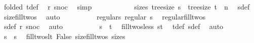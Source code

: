 \begin{isabellebody}
\ {}{\isacharparenleft}{\kern0pt}{}{\isacharparenright}{\kern0pt}{\isacharbrackleft}{\kern0pt}folded\ t{\isacharunderscore}{\kern0pt}def{\isacharbrackright}{\kern0pt}\ \isamarkupfalse%
\ r\ snoc\ \isamarkupfalse%
\ simp\isanewline
\ \ \ \ \ \ \ \ \isamarkupfalse%
\ \isamarkupfalse%
\ size{\isacharunderscore}{\kern0pt}s{\isacharprime}{\kern0pt}{\isacharprime}{\kern0pt}{\isacharcolon}{\kern0pt}\ {\isachardoublequoteopen}tree{\isacharunderscore}{\kern0pt}size\ s{\isacharprime}{\kern0pt}{\isacharprime}{\kern0pt}\ {\isacharequal}{\kern0pt}\ tree{\isacharunderscore}{\kern0pt}size\ t\ {\isacharplus}{\kern0pt}\ n{\isachardoublequoteclose}\ \isamarkupfalse%
\ s{\isacharprime}{\kern0pt}{\isacharprime}{\kern0pt}{\isacharunderscore}{\kern0pt}def\ \isamarkupfalse%
\ size{\isacharunderscore}{\kern0pt}fill{\isacharunderscore}{\kern0pt}twos\ \isamarkupfalse%
\ auto\isanewline
\ \ \ \ \ \ \ \ \isamarkupfalse%
\ regular{\isacharunderscore}{\kern0pt}s{\isacharprime}{\kern0pt}{\isacharprime}{\kern0pt}{\isacharcolon}{\kern0pt}\ {\isachardoublequoteopen}regular\ s{\isacharprime}{\kern0pt}{\isacharprime}{\kern0pt}{\isachardoublequoteclose}\ \isamarkupfalse%
\ regular{\isacharunderscore}{\kern0pt}fill{\isacharunderscore}{\kern0pt}twos\ {}{\isacharparenleft}{\kern0pt}{}{\isacharparenright}{\kern0pt}\ \isamarkupfalse%
\ s{\isacharprime}{\kern0pt}{\isacharprime}{\kern0pt}{\isacharunderscore}{\kern0pt}def\ r\ snoc\ \isamarkupfalse%
\ auto\isanewline
\ \ \ \ \ \ \ \ \isamarkupfalse%
\ {\isachardoublequoteopen}s{\isacharprime}{\kern0pt}{\isacharprime}{\kern0pt}\ {\isacharless}{\kern0pt}\ t{\isachardoublequoteclose}\ \isamarkupfalse%
\ fill{\isacharunderscore}{\kern0pt}twos{\isacharunderscore}{\kern0pt}less\ {\isacartoucheopen}s{\isacharprime}{\kern0pt}{\isacharless}{\kern0pt}t{\isacartoucheclose}\ \isamarkupfalse%
\ t{\isacharunderscore}{\kern0pt}def\ s{\isacharprime}{\kern0pt}{\isacharprime}{\kern0pt}{\isacharunderscore}{\kern0pt}def\ \isamarkupfalse%
\ auto\isanewline
\ \ \ \ \ \ \ \ \isamarkupfalse%
\ {\isachardoublequoteopen}s{\isacharprime}{\kern0pt}\ {\isacharless}{\kern0pt}\ s{\isacharprime}{\kern0pt}{\isacharprime}{\kern0pt}{\isachardoublequoteclose}\ \isamarkupfalse%
\ fill{\isacharunderscore}{\kern0pt}twos{\isacharunderscore}{\kern0pt}lt\ False\ size{\isacharunderscore}{\kern0pt}fill{\isacharunderscore}{\kern0pt}twos\ size{\isacharunderscore}{\kern0pt}s{\isacharprime}{\kern0pt}{\isacharprime}{\kern0pt}\ \isamarkupfalse%

\end{isabellebody}

